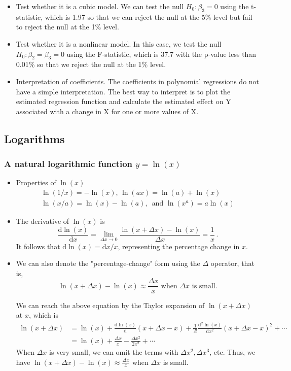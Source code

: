 \documentclass[a4paper,11pt]{article}
\newcommand{\dx}{\mathrm{d}}
\begin{document}
\begin{itemize}
\item Test whether it is a cubic model. We can test the null \(H_0: \beta_3
  = 0\) using the t-statistic, which is 1.97 so that we can reject the
null at the 5\% level but fail to reject the null at the 1\% level.
\item Test whether it is a nonlinear model. In this case, we test the null
\(H_0: \beta_2 = \beta_3 = 0\) using the F-statistic, which is 37.7
with the p-value less than 0.01\% so that we reject the null at the
1\% level.
\item Interpretation of coefficients. The coefficients in polynomial
regressions do not have a simple interpretation. The best way to
interpret is to plot the estimated regression function and calculate
the estimated effect on Y associated with a change in X for one or
more values of X.
\end{itemize}


\subsection{Logarithms}
\label{sec:orgb057295}
\subsubsection*{A natural logarithmic function \(y = \ln(x)\)}
\label{sec:orgf2130c7}
\begin{itemize}
\item Properties of \(\ln(x)\)
\begin{gather*}
\ln(1/x) = -\ln(x),\, \ln(ax) = \ln(a) + \ln(x) \\
\ln(x/a) = \ln(x) - \ln(a),\, \text{ and } \ln(x^a) = a\ln(x)
\end{gather*}

\item The derivative of \(\ln(x)\) is
\[ \frac{\dx \ln(x)}{\dx x} = \lim_{\Delta x \rightarrow 0}
  \frac{\ln(x + \Delta x) - \ln(x)}{\Delta x} = \frac{1}{x}\,\text{.} \]
It follows that \(\dx \ln(x) = \dx x / x\), representing the percentage
change in \(x\).

\item We can also denote the "percentage-change" form using the \(\Delta\)
operator, that is,
\[ \ln(x + \Delta x) - \ln(x) \approx \frac{\Delta x}{x} \text{ when
  } \Delta x \text{ is small.} \]

We can reach the above equation by the Taylor expansion of \(\ln(x +
  \Delta x)\) at \(x\), which is
\begin{align*}
\ln(x + \Delta x) &= \ln(x) + \frac{\dx \ln(x)}{\dx} (x + \Delta x - x) + \frac{1}{2!}\frac{\dx^2 \ln(x)}{\dx x^2}(x + \Delta x - x)^2 + \cdots \\
&= \ln(x) + \frac{\Delta x}{x} -\frac{\Delta x^2}{2x^2} + \cdots
\end{align*}
When \(\Delta x\) is very small, we can omit the terms with \(\Delta
  x^2, \Delta x^3\), etc. Thus, we have \(\ln(x + \Delta x) - \ln(x)
  \approx \frac{\Delta x}{x}\) when \(\Delta x\) is small.
\end{itemize}
\end{document}
